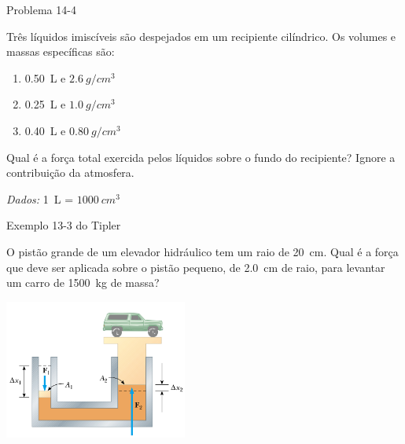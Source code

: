 \begin{frame}{Problema 14-4}
    \begin{minipage}{\textwidth}
        Três líquidos imiscíveis são despejados em um recipiente cilíndrico. Os volumes e
        massas específicas são:
        \begin{enumerate}
            \item \SI{0,50}{L} e \(\SI{2,6}{g/cm^3}\)
            \item \SI{0,25}{L} e \(\SI{1,0}{g/cm^3}\)
            \item \SI{0,40}{L} e \(\SI{0,80}{g/cm^3}\)
        \end{enumerate}
        Qual é a força total exercida pelos líquidos sobre o fundo do recipiente? Ignore
        a contribuição da atmosfera.
    \end{minipage}

    \vspace{1cm}
    \textit{Dados:} \SI{1}{L} =  \(\SI{1000}{cm^3}\)
\end{frame}

\begin{frame}{Exemplo 13-3 do Tipler}
    \begin{minipage}{\textwidth}
        O pistão grande de um elevador hidráulico tem um raio de \SI{20}{cm}.
        Qual é a força que deve ser aplicada sobre o pistão pequeno, de
        \SI{2.0}{cm} de raio, para levantar um carro de \SI{1500}{kg} de massa?
    \end{minipage}
    \begin{center}
        \includegraphics[width=0.45\textwidth]{images/pistao}
    \end{center}
\end{frame}

